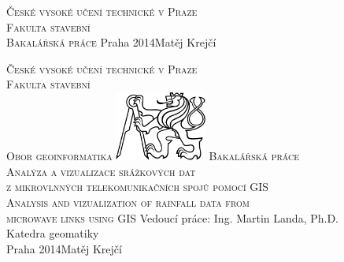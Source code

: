 \begin{center}
\newcommand{\napisCVUT}{České vysoké učení technické v Praze}
\newcommand{\napisFS}{Fakulta stavební}
\newcommand{\napisObor}{Obor geoinformatika}
\newcommand{\napisKatedra}{Katedra geomatiky}
\newcommand{\napisVedouci}{Ing. Martin Landa, Ph.D.}
\newcommand{\napisAutor}{Matěj Krejčí}
\newcommand{\napisDatum}{Praha 2014}
\newcommand{\napisNazevI}{Analýza a vizualizace srážkových dat }
\newcommand{\napisNazevII}{z mikrovlnných telekomunikačních spojů pomocí GIS}
\newcommand{\napisNazevAjI}{Analysis and vizualization of rainfall data from}
\newcommand{\napisNazevAjII}{microwave links using GIS}
\newcommand{\napisBakalarka}{Bakalářská práce}
\newcommand{\napisPraha}{Praha 2014}
%
\newcommand{\velka}[1]{\textsc{#1}}
%
% 
\newif\ifpatitul
\patitultrue

\ifpatitul
{\Large\velka{\napisCVUT}}\\
\velka{\Large\napisFS}\\
\vfill
{\LARGE\velka{\napisBakalarka}}
\vfill
{\large\napisPraha\hfill\napisAutor}
\newpage
\fi%


{\Large\velka{\napisCVUT}}\\
{\Large\velka{\napisFS}}\\
{\Large\velka{\napisObor}}
\vfill
\includegraphics[width=3cm]{logo_cvut_cb} %
\vfill
{\Large\velka{\napisBakalarka}}\\
{\Large\velka{\napisNazevI\\
\napisNazevII}}\\
{\large\velka{\napisNazevAjI\\
\napisNazevAjII}}
\vfill
{\large%
Vedoucí práce: \napisVedouci\\
\napisKatedra\\
\bigskip
\napisDatum\hfill\napisAutor}
\end{center}
